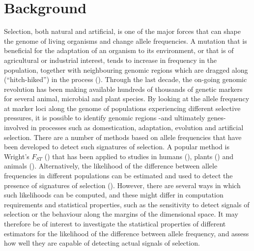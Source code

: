 \documentclass{bmcart}
\begin{document}


\section*{Background}
Selection, both natural and artificial, is one of the major forces that
can shape the genome of living organisms and change allele frequencies.
A mutation that is beneficial for the adaptation of an organism to its
environment, or that is of agricultural or industrial interest, tends to increase in
frequency in the population, together with neighbouring genomic regions
which are dragged along (``hitch-hiked'') in the process (\cite{braverman1995hitchhiking}). 
Through the last decade, the on-going genomic revolution has been making
available hundreds of thousands of genetic markers for several animal, microbial and
plant species. By looking at the allele frequency at marker loci along
the genome of populations experiencing different selective pressures, it
is possible to identify genomic regions -and ultimately genes- involved
in processes such as domestication, adaptation, evolution and artificial
selection. There are a number of methods based on allele frequencies
that have been developed to detect such signatures of selection. A
popular method is Wright's $F_{ST}$
(\cite{wright1949genetical,nei1977f}) that has been applied to
studies in humans (\cite{akey2002interrogating}), plants
(\cite{zhao2010genomic}) and animals (\cite{kijas2012genome}).
Alternatively, the likelihood of the difference between allele
frequencies in different populations can be estimated and used to detect
the presence of signatures of selection
(\cite{nielsen2005genomic,stella2010identification}).
However, there are several ways in which such likelihoods can be
computed, and these might differ in computation requirements and
statistical properties, such as the sensitivity to detect signals of
selection or the behaviour along the margins of the dimensional space.
It may therefore be of interest to investigate the statistical
properties of different estimators
for the likelihood of the difference between allele frequency, and
assess how well they are capable of detecting actual signals of
selection.
\end{document}
